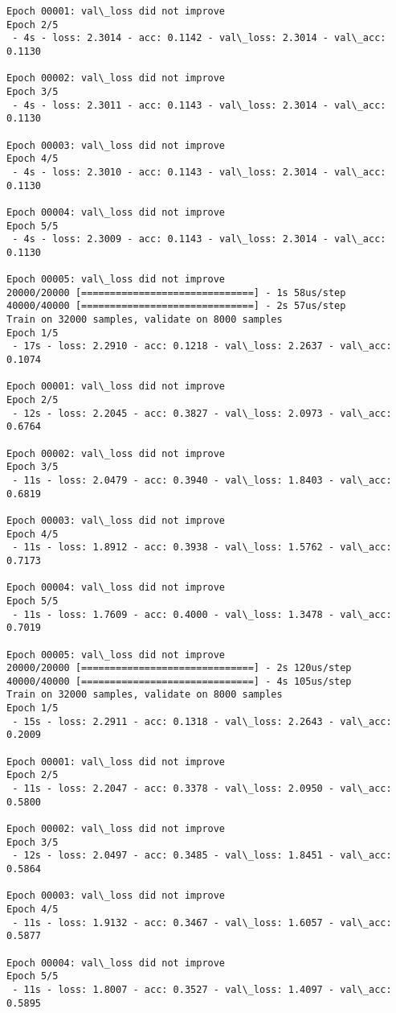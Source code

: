 \documentclass[11pt]{article}
\begin{document}
\begin{Verbatim}[commandchars=\\\{\}]
Epoch 00001: val\_loss did not improve
Epoch 2/5
 - 4s - loss: 2.3014 - acc: 0.1142 - val\_loss: 2.3014 - val\_acc: 0.1130

Epoch 00002: val\_loss did not improve
Epoch 3/5
 - 4s - loss: 2.3011 - acc: 0.1143 - val\_loss: 2.3014 - val\_acc: 0.1130

Epoch 00003: val\_loss did not improve
Epoch 4/5
 - 4s - loss: 2.3010 - acc: 0.1143 - val\_loss: 2.3014 - val\_acc: 0.1130

Epoch 00004: val\_loss did not improve
Epoch 5/5
 - 4s - loss: 2.3009 - acc: 0.1143 - val\_loss: 2.3014 - val\_acc: 0.1130

Epoch 00005: val\_loss did not improve
20000/20000 [==============================] - 1s 58us/step
40000/40000 [==============================] - 2s 57us/step
Train on 32000 samples, validate on 8000 samples
Epoch 1/5
 - 17s - loss: 2.2910 - acc: 0.1218 - val\_loss: 2.2637 - val\_acc: 0.1074

Epoch 00001: val\_loss did not improve
Epoch 2/5
 - 12s - loss: 2.2045 - acc: 0.3827 - val\_loss: 2.0973 - val\_acc: 0.6764

Epoch 00002: val\_loss did not improve
Epoch 3/5
 - 11s - loss: 2.0479 - acc: 0.3940 - val\_loss: 1.8403 - val\_acc: 0.6819

Epoch 00003: val\_loss did not improve
Epoch 4/5
 - 11s - loss: 1.8912 - acc: 0.3938 - val\_loss: 1.5762 - val\_acc: 0.7173

Epoch 00004: val\_loss did not improve
Epoch 5/5
 - 11s - loss: 1.7609 - acc: 0.4000 - val\_loss: 1.3478 - val\_acc: 0.7019

Epoch 00005: val\_loss did not improve
20000/20000 [==============================] - 2s 120us/step
40000/40000 [==============================] - 4s 105us/step
Train on 32000 samples, validate on 8000 samples
Epoch 1/5
 - 15s - loss: 2.2911 - acc: 0.1318 - val\_loss: 2.2643 - val\_acc: 0.2009

Epoch 00001: val\_loss did not improve
Epoch 2/5
 - 11s - loss: 2.2047 - acc: 0.3378 - val\_loss: 2.0950 - val\_acc: 0.5800

Epoch 00002: val\_loss did not improve
Epoch 3/5
 - 12s - loss: 2.0497 - acc: 0.3485 - val\_loss: 1.8451 - val\_acc: 0.5864

Epoch 00003: val\_loss did not improve
Epoch 4/5
 - 11s - loss: 1.9132 - acc: 0.3467 - val\_loss: 1.6057 - val\_acc: 0.5877

Epoch 00004: val\_loss did not improve
Epoch 5/5
 - 11s - loss: 1.8007 - acc: 0.3527 - val\_loss: 1.4097 - val\_acc: 0.5895


\end{Verbatim}
\end{document}
